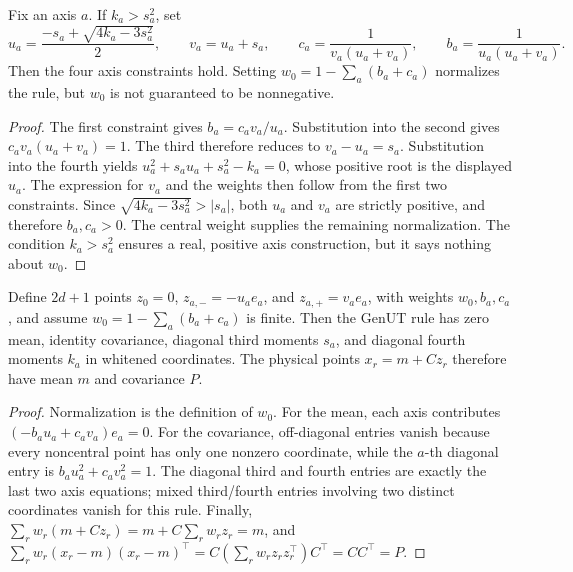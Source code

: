 \begin{proposition}
\label{prop:bf-eot-genut-axis}
Fix an axis \(a\).  If \(k_a>s_a^2\), set
\begin{equation}
 u_a=\frac{-s_a+\sqrt{4k_a-3s_a^2}}2,
 \qquad v_a=u_a+s_a,
 \qquad c_a=\frac1{v_a(u_a+v_a)},
 \qquad b_a=\frac1{u_a(u_a+v_a)}.
\end{equation}
Then the four axis constraints hold.  Setting
\(w_0=1-\sum_a(b_a+c_a)\) normalizes the rule, but \(w_0\) is not guaranteed
to be nonnegative.
\end{proposition}

\begin{proof}
The first constraint gives \(b_a=c_av_a/u_a\).  Substitution into the second
gives \(c_av_a(u_a+v_a)=1\).  The third therefore reduces to
\(v_a-u_a=s_a\).  Substitution into the fourth yields
\(u_a^2+s_au_a+s_a^2-k_a=0\), whose positive root is the displayed \(u_a\).
The expression for \(v_a\) and the weights then follow from the first two
constraints.  Since \(\sqrt{4k_a-3s_a^2}>|s_a|\), both \(u_a\) and \(v_a\) are
strictly positive, and therefore \(b_a,c_a>0\).  The central weight supplies
the remaining normalization.  The condition \(k_a>s_a^2\) ensures a real,
positive axis construction, but it says nothing about \(w_0\).
\end{proof}

\begin{proposition}
\label{prop:bf-eot-genut-moments}
Define \(2d+1\) points \(z_0=0\), \(z_{a,-}=-u_ae_a\), and
\(z_{a,+}=v_ae_a\), with weights \(w_0,b_a,c_a\), and assume
\(w_0=1-\sum_a(b_a+c_a)\) is finite.  Then the GenUT rule has zero mean,
identity covariance, diagonal third moments \(s_a\), and diagonal fourth
moments \(k_a\) in whitened coordinates.  The physical points
\(x_r=m+Cz_r\) therefore have mean \(m\) and covariance \(P\).
\end{proposition}

\begin{proof}
Normalization is the definition of \(w_0\).  For the mean, each axis contributes
\((-b_au_a+c_av_a)e_a=0\).  For the covariance, off-diagonal entries vanish
because every noncentral point has only one nonzero coordinate, while the
\(a\)-th diagonal entry is \(b_au_a^2+c_av_a^2=1\).  The diagonal third and
fourth entries are exactly the last two axis equations; mixed third/fourth
entries involving two distinct coordinates vanish for this rule.  Finally,
\(\sum_r w_r(m+Cz_r)=m+C\sum_r w_rz_r=m\), and
\(\sum_r w_r(x_r-m)(x_r-m)^\top
=C(\sum_r w_rz_rz_r^\top)C^\top=CC^\top=P\).
\end{proof}

